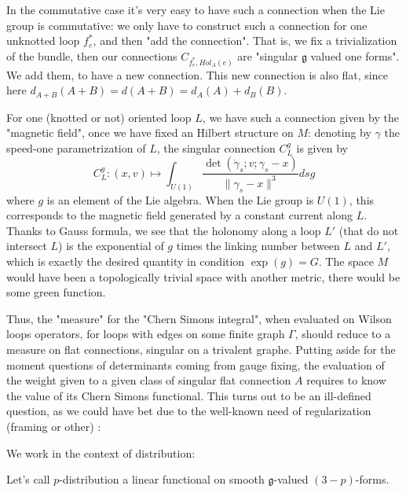 \documentclass[10pt]{article}
\begin{document}
In the commutative case it's very easy to have such a connection when the Lie group is commutative: we only have to construct such a connection for one unknotted loop $f^*_e$, and then "add the connection". That is, we fix a trivialization of the bundle, then our connections $C_{ f^*_e, Hol_A(e) } $ are "singular $\mathfrak{g}$ valued one forms". We add them, to have a new connection. This new connection is also flat, since here $d_{A+B}(A+B)=d(A+B)=d_A(A)+d_B(B)$.

For one (knotted or not) oriented loop $L$, we have such a connection given by the "magnetic field", once we have fixed an Hilbert structure on $M$: denoting by $\gamma$ the speed-one parametrization of $L$, the singular connection $C_L^g$ is given by
\[C_L^g: (x,v)\mapsto \int_{U(1)}\frac{\det(\dot\gamma_s; v; \gamma_s-x)}{\|\gamma_s-x\|^3} ds g\]
where $g$ is an element of the Lie algebra.  When the Lie group is $U(1)$, this corresponds to the magnetic field generated by a constant current along $L$. Thanks to Gauss formula, we see that the holonomy along a loop $L'$ (that do not intersect $L$) is the exponential of $g$ times the linking number between $L$ and $L'$, which is exactly the desired quantity in condition $\exp(g)=G$. The space $M$ would have been a topologically trivial space with another metric, there would be some green function.




Thus, the "measure" for the "Chern Simons integral", when evaluated on Wilson loops operators, for loops with edges on some finite graph $\Gamma$, should reduce to a measure on flat connections, singular on a trivalent graphe. Putting aside for the moment questions of determinants coming from gauge fixing, the evaluation of the weight given to a given class of singular flat connection $A$ requires to know the value of its Chern Simons functional. This turns out to be an ill-defined question, as we could have bet due to the well-known need of regularization (framing or other) :

We work in the context of distribution: %

Let's call $p$-distribution a linear functional on smooth $\mathfrak{g}$-valued $(3-p)$-forms.
\end{document}
